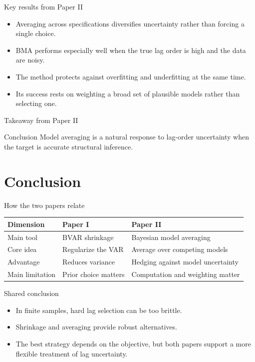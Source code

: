 \documentclass[aspectratio=169]{beamer}
\begin{document}
\begin{frame}{Key results from Paper II}
  \begin{itemize}
    \item Averaging across specifications diversifies uncertainty rather than forcing a single choice.
    \item BMA performs especially well when the true lag order is high and the data are noisy.
    \item The method protects against overfitting and underfitting at the same time.
    \item Its success rests on weighting a broad set of plausible models rather than selecting one.
  \end{itemize}
\end{frame}

\begin{frame}{Takeaway from Paper II}
  \begin{block}{Conclusion}
    Model averaging is a natural response to lag-order uncertainty when the target is accurate structural inference.
  \end{block}
\end{frame}

\section{Conclusion}

\begin{frame}{How the two papers relate}
  \begin{table}
    \centering
    \begin{tabular}{p{}p{}p{}}
      \toprule
      \textbf{Dimension} & \textbf{Paper I} & \textbf{Paper II} \\
      \midrule
      Main tool & BVAR shrinkage & Bayesian model averaging \\
      Core idea & Regularize the VAR & Average over competing models \\
      Advantage & Reduces variance & Hedging against model uncertainty \\
      Main limitation & Prior choice matters & Computation and weighting matter \\
      \bottomrule
    \end{tabular}
  \end{table}
\end{frame}

\begin{frame}{Shared conclusion}
  \begin{itemize}
    \item In finite samples, hard lag selection can be too brittle.
    \item Shrinkage and averaging provide robust alternatives.
    \item The best strategy depends on the objective, but both papers support a more flexible treatment of lag uncertainty.
  \end{itemize}
\end{frame}
\end{document}
